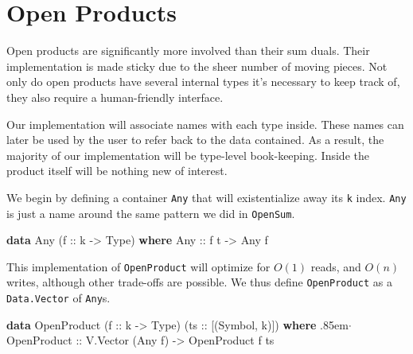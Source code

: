 \documentclass[
  11pt,
]{book}
\makeatletter
\newenvironment{Shaded}{}{}
\newcommand{\DataTypeTok}[1]{\textcolor[rgb]{0.56,0.13,0.00}{#1}}
\newcommand{\KeywordTok}[1]{\textcolor[rgb]{0.00,0.44,0.13}{\textbf{#1}}}
\newcommand{\NormalTok}[1]{#1}
\newcommand{\OtherTok}[1]{\textcolor[rgb]{0.00,0.44,0.13}{#1}}
\newcommand{\anncirc}[1]{\raisebox{-0.5mm}{\tikz\node[text=white,
font=\sffamily\bfseries,minimum size=2mm,inner sep=0mm,draw,circle,fill=black]
{\small #1};}}
\newcommand{\annotate}[1]{\Dotfill\quad\anncirc{#1}\qquad}
\newcommand{\Dotfill}{\leavevmode \cleaders \hb@xt@.85em{\ensuremath{\hss
\cdot\hss}}
\hfill \kern \z@}
\theoremstyle{nonumberplain}
\makeatother
\begin{document}
\hypertarget{open-products}{%
\section{Open Products}\label{open-products}}

Open products are significantly more involved than their sum duals.
Their implementation is made sticky due to the sheer number of moving
pieces. Not only do open products have several internal types it's
necessary to keep track of, they also require a human-friendly
interface.

Our implementation will associate names with each type inside. These
names can later be used by the user to refer back to the data contained.
As a result, the majority of our implementation will be type-level
book-keeping. Inside the product itself will be nothing new of interest.

We begin by defining a container \texttt{Any} that will existentialize
away its \texttt{k} index. \texttt{Any} is just a name around the same
pattern we did in \texttt{OpenSum}.

\begin{Shaded}
\begin{Highlighting}[]
\KeywordTok{data} \DataTypeTok{Any}\NormalTok{ (}\OtherTok{f ::}\NormalTok{ k }\OtherTok{{-}\textgreater{}} \DataTypeTok{Type}\NormalTok{) }\KeywordTok{where}
  \DataTypeTok{Any}\OtherTok{ ::}\NormalTok{ f t }\OtherTok{{-}\textgreater{}} \DataTypeTok{Any}\NormalTok{ f}
\end{Highlighting}
\end{Shaded}

This implementation of \texttt{OpenProduct} will optimize for \(O(1)\)
reads, and \(O(n)\) writes, although other trade-offs are possible. We
thus define \texttt{OpenProduct} as a \texttt{Data.Vector} of
\texttt{Any}s.

\begin{Shaded}
\begin{Highlighting}[]
\KeywordTok{data} \DataTypeTok{OpenProduct}\NormalTok{ (}\OtherTok{f  ::}\NormalTok{ k }\OtherTok{{-}\textgreater{}} \DataTypeTok{Type}\NormalTok{)}
\NormalTok{                 (}\OtherTok{ts ::}\NormalTok{ [(}\DataTypeTok{Symbol}\NormalTok{, k)]) }\KeywordTok{where}  \annotate{1}
  \DataTypeTok{OpenProduct}\OtherTok{ ::} \DataTypeTok{V.Vector}\NormalTok{ (}\DataTypeTok{Any}\NormalTok{ f) }\OtherTok{{-}\textgreater{}} \DataTypeTok{OpenProduct}\NormalTok{ f ts}
\end{Highlighting}
\end{Shaded}
\end{document}
